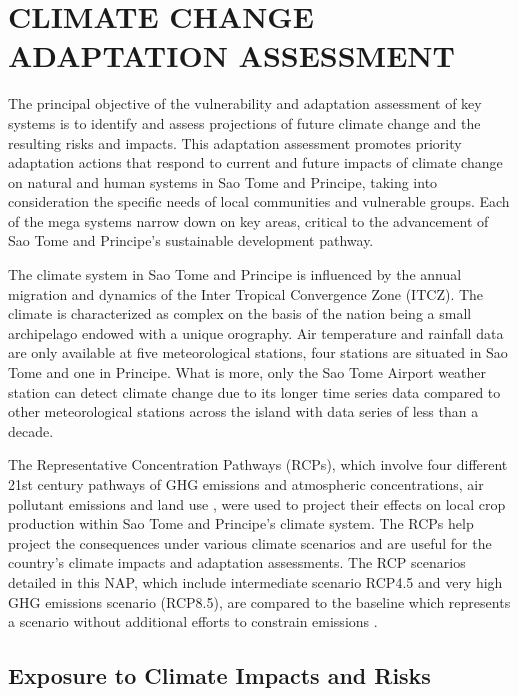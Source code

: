 \documentclass[
]{book}
\begin{document}
\hypertarget{climate-change-adaptation-assessment}{%
\chapter{CLIMATE CHANGE ADAPTATION ASSESSMENT}\label{climate-change-adaptation-assessment}}

The principal objective of the vulnerability and adaptation assessment of key systems is to identify and assess projections of future climate change and the resulting risks and impacts. This adaptation assessment promotes priority adaptation actions that respond to current and future impacts of climate change on natural and human systems in Sao Tome and Principe, taking into consideration the specific needs of local communities and vulnerable groups. Each of the mega systems narrow down on key areas, critical to the advancement of Sao Tome and Principe's sustainable development pathway.

The climate system in Sao Tome and Principe is influenced by the annual migration and dynamics of the Inter Tropical Convergence Zone (ITCZ). The climate is characterized as complex on the basis of the nation being a small archipelago endowed with a unique orography. Air temperature and rainfall data are only available at five meteorological stations, four stations are situated in Sao Tome and one in Principe. What is more, only the Sao Tome Airport weather station can detect climate change due to its longer time series data compared to other meteorological stations across the island with data series of less than a decade.

The Representative Concentration Pathways (RCPs), which involve four different 21st century pathways of GHG emissions and atmospheric concentrations, air pollutant emissions and land use , were used to project their effects on local crop production within Sao Tome and Principe's climate system. The RCPs help project the consequences under various climate scenarios and are useful for the country's climate impacts and adaptation assessments. The RCP scenarios detailed in this NAP, which include intermediate scenario RCP4.5 and very high GHG emissions scenario (RCP8.5), are compared to the baseline which represents a scenario without additional efforts to constrain emissions .

\hypertarget{exposure-to-climate-impacts-and-risks}{%
\section{Exposure to Climate Impacts and Risks}\label{exposure-to-climate-impacts-and-risks}}
\end{document}

